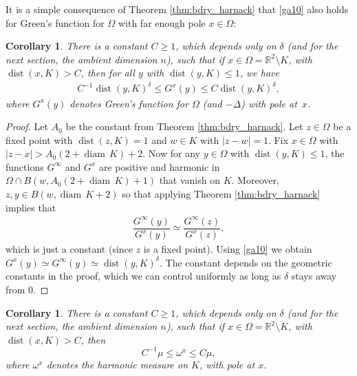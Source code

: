 \documentclass[10pt]{amsart}
\let\sm\setminus
\numberwithin{equation}{section}
\theoremstyle{plain}
\newtheorem{cor}[lem]{Corollary}
\theoremstyle{definition}
\newcommand{\R}{\mathbb{R}}
\DeclareMathOperator{\dist}{dist}
\DeclareMathOperator{\diam}{diam}
\begin{document}
It is a simple consequence of Theorem \ref{thm:bdry_harnack} that \eqref{ga10} also
holds for Green's function for $\Omega$ with far enough pole $x \in \Omega$:

\begin{cor}\label{cor:finite_pole}
There is a constant $C \geq 1$, which depends only on $\delta$
(and for the next section, the ambient dimension $n$), such that if
$x \in \Omega = \R^2 \sm K$, with $\dist(x, K) > C$, then for
all $y$ with $\dist(y,K) \le 1$, we have\vspace*{-3pt}
\begin{align*}
C^{-1} \dist(y, K)^\delta \leq G^x(y) \leq C \dist(y, K)^\delta,
\end{align*}
where $G^x(y)$ denotes Green's %
function for $\Omega$ (and $-\Delta$) with pole at~$x$.
\end{cor}

\begin{proof}
Let $A_0$ be the constant from Theorem \ref{thm:bdry_harnack}.
Let $z \in \Omega$ be a fixed point with $\dist(z, K) = 1$ and $w \in K$ with $|z- w| = 1$.
Fix $x \in \Omega$ with $|z - x| > A_0(2 + \diam \, K) + 2$.
Now for any $y \in \Omega$ with $\dist(y, K) \le 1$,
the functions $G^\infty$ and $G^x$ are positive and harmonic in $\Omega \cap B(w, A_0(2+\diam \, K) + 1)$ that vanish on $K$. Moreover, $z, y \in B(w, \diam \, K + 2)$ so that applying Theorem \ref{thm:bdry_harnack} implies that\vspace*{-3pt}
\begin{align*}
\dfrac{G^\infty(y)}{G^x(y)} \simeq \dfrac{G^\infty(z)}{G^x(z)},
\end{align*}
which is just a constant (since $z$ is a fixed point). Using \eqref{ga10} we obtain
$G^x(y) \simeq G^\infty(y) \simeq \dist(y, K)^\delta$. The constant depends on the geometric constants in the proof,
which we can control uniformly as long as $\delta$ stays away from $0$.
\end{proof}

\begin{cor}
There is a constant $C \geq 1$, which depends only on $\delta$
(and for the next section, the ambient dimension $n$), such that if
$x \in \Omega = \R^2 \sm K$, with $\dist(x, K) > C$, then\vspace*{-3pt}
\begin{equation} \label{3a14}
C^{-1} \mu \leq \omega^x \leq C \mu,
\end{equation}
where $\omega^x$ denotes the harmonic measure on $K$, with pole at $x$.
\end{cor}
\end{document}
